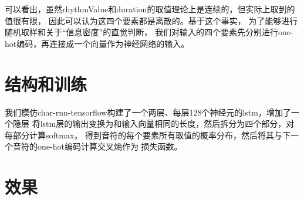 \documentclass{article}
\begin{document}
    可以看出，虽然rhythmValue和duration的取值理论上是连续的，但实际上取到的值很有限，
    因此可以认为这四个要素都是离散的。基于这个事实，
    为了能够进行随机取样和关于“信息密度”的直觉判断，
    我们对输入的四个要素先分别进行one-hot编码，再连接成一个向量作为神经网络的输入。

  \section{结构和训练}
    我们模仿char-rnn-tensorflow构建了一个两层、每层128个神经元的lstm，增加了一个隐层
    将lstm层的输出变换为和输入向量相同的长度，然后拆分为四个部分，对每部分计算softmax，
    得到音符的每个要素所有取值的概率分布，然后将其与下一个音符的one-hot编码计算交叉熵作为
    损失函数。
  \section{效果}
\end{document}
